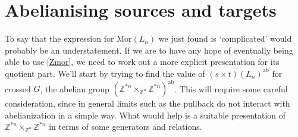 \documentclass{amsbook} %
\numberwithin{section}{chapter}
\begin{document}
\section{Abelianising sources and targets}
 
To say that the expression for $\mathrm{Mor}(L_n)$ we just found is `complicated' would probably be an understatement. If we are to have any hope of eventually being able to use \cref{Zmor}, we need to work out a more explicit presentation for its quotient part. We'll start by trying to find the value of $(s \times t)(L_n)^{\mathrm{ab}}$ for crossed $G$, the abelian group $(\mathbb{Z}^{\ast n} \times_{\mathbb{Z}^n} \mathbb{Z}^{\ast n})^{\mathrm{ab}}$. This will require some careful consideration, since in general limits such as the pullback do not interact with abelianization in a simple way. What would help is a suitable presentation of $\mathbb{Z}^{\ast n} \times_{\mathbb{Z}^n} \mathbb{Z}^{\ast n}$ in terms of some generators and relations. 
\end{document}
